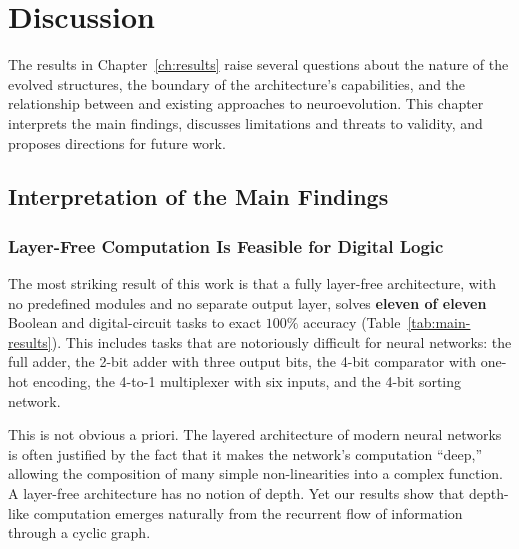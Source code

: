 
\chapter{Discussion}
\label{ch:discussion}

The results in Chapter~\ref{ch:results} raise several questions about
the nature of the evolved structures, the boundary of the architecture's
capabilities, and the relationship between \modnet{} and existing
approaches to neuroevolution. This chapter interprets the main findings,
discusses limitations and threats to validity, and proposes directions
for future work.

\section{Interpretation of the Main Findings}
\label{sec:disc-interpretation}

\subsection{Layer-Free Computation Is Feasible for Digital Logic}
\label{sec:disc-layer-free}

The most striking result of this work is that a fully layer-free
architecture, with no predefined modules and no separate output layer,
solves \textbf{eleven of eleven} Boolean and digital-circuit tasks to
exact $100\%$ accuracy (Table~\ref{tab:main-results}). This includes
tasks that are notoriously difficult for neural networks: the full
adder, the 2-bit adder with three output bits, the 4-bit comparator
with one-hot encoding, the 4-to-1 multiplexer with six inputs, and the
4-bit sorting network.

This is not obvious a priori. The layered architecture of modern neural
networks is often justified by the fact that it makes the network's
computation ``deep,'' allowing the composition of many simple
non-linearities into a complex function. A layer-free architecture has
no notion of depth. Yet our results show that depth-like computation
emerges naturally from the recurrent flow of information through a
cyclic graph.

